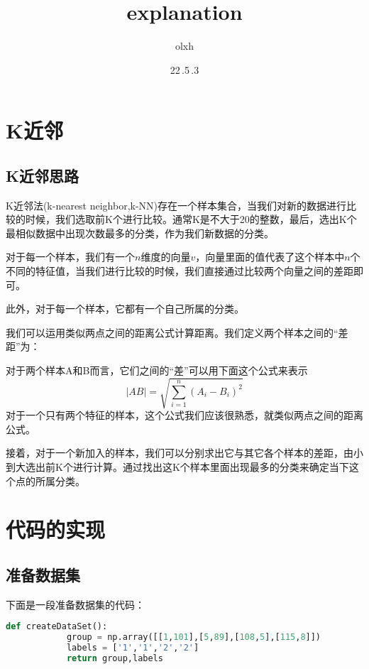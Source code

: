 \documentclass[11pt,twoside,a4paper]{article}
\begin{document}
    \title{explanation}
    \author{olxh}
    \date{22\,.5\,.3}

    \maketitle
    \section{K近邻}
    \subsection{K近邻思路}
        K近邻法(k-nearest neighbor,k-NN)存在一个样本集合，当我们对新的数据进行比较的时候，我们选取前K个进行比较。通常K是不大于20的整数，最后，选出K个最相似数据中出现次数最多的分类，作为我们新数据的分类。
    
        对于每一个样本，我们有一个$n$维度的向量$v$，向量里面的值代表了这个样本中$n$个不同的特征值，当我们进行比较的时候，我们直接通过比较两个向量之间的差距即可。
        
        此外，对于每一个样本，它都有一个自己所属的分类。

        我们可以运用类似两点之间的距离公式计算距离。我们定义两个样本之间的“差距”为：

        对于两个样本A和B而言，它们之间的“差”可以用下面这个公式来表示
        \begin{displaymath}
            |AB| = \sqrt{ \sum_{i=1}^{n} (A_i-B_i)^2 }
        \end{displaymath}
        对于一个只有两个特征的样本，这个公式我们应该很熟悉，就类似两点之间的距离公式。

        接着，对于一个新加入的样本，我们可以分别求出它与其它各个样本的差距，由小到大选出前K个进行计算。通过找出这K个样本里面出现最多的分类来确定当下这个点的所属分类。


    \section{代码的实现}
    \subsection{准备数据集}
        下面是一段准备数据集的代码：
        \begin{lstlisting}[language={Python}]
            def createDataSet():
            group = np.array([[1,101],[5,89],[108,5],[115,8]])
            labels = ['1','1','2','2']
            return group,labels
        \end{lstlisting}

    
\end{document}
